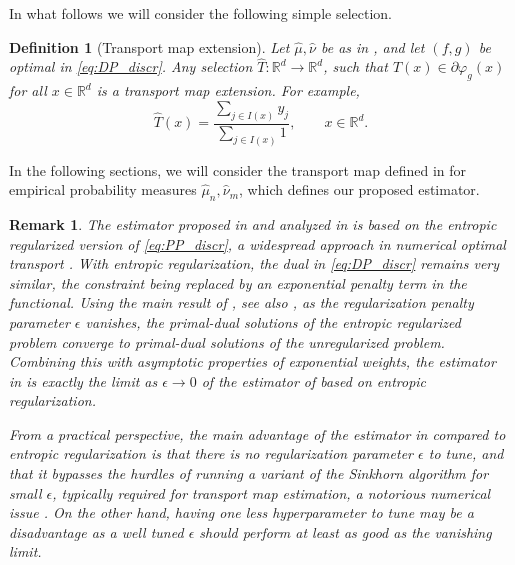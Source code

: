 \documentclass[11pt]{article}
\newtheorem{definition}[lemma]{Definition}
\newtheorem{remark}[lemma]{Remark}
\newcommand{\R}{\mathbb R}
\newcommand{\1}{\mathbbm{1}}
\numberwithin{equation}{section}
\begin{document}
In what follows we will consider the following simple selection.
\begin{definition}[Transport map extension]
    Let $\hat\mu,\hat\nu$ be as in , and let $(f,g)$ be optimal in \eqref{eq:DP_discr}.
    Any  selection $\hat T \colon \R^d \to \R^d$, such that $\hat T(x) \in \partial \varphi_g(x)$ for all $x \in \R^d$ is a transport map extension. For example, 
    \begin{equation*}
        \hat T(x) = \frac{\sum_{j \in I(x)} y_j}{\sum_{j \in I(x)} 1}, \qquad x \in \R^d.
    \end{equation*}
\label{def:transportmap_estimator}
\end{definition}


In the following sections, we will consider the transport map defined in  for empirical probability measures $\hat\mu_n,\hat\nu_m$, which defines our proposed estimator.

\begin{remark}
    The estimator proposed in \cite{seguy2018large} and analyzed in \cite{pooladian2021entropic,pooladian2023minimax} is based on the entropic regularized version of \eqref{eq:PP_discr}, a widespread approach in numerical optimal transport 
    \cite{cuturi2013sinkhorn,peyre2019computational}. With entropic regularization, the dual in \eqref{eq:DP_discr} remains very similar, the constraint being replaced by an exponential penalty term in the functional. Using the main result of \cite{cominetti1994asymptotic}, see also \cite{genevay2016stochastic,weed2018explicit}, as the regularization penalty parameter $\epsilon$ vanishes, the primal-dual solutions of the entropic regularized problem converge to primal-dual solutions of the unregularized problem. Combining this with asymptotic properties of exponential weights, the estimator in  is exactly the limit as $\epsilon \to 0$ of the estimator of \cite{seguy2018large, pooladian2021entropic,pooladian2023minimax} based on entropic regularization.

    From a practical perspective, the main advantage of the estimator in  compared to entropic regularization is that there is no regularization parameter $\epsilon$ to tune, and that it bypasses the hurdles of running a variant of the Sinkhorn algorithm for small $\epsilon$, typically required for transport map estimation, a notorious numerical issue \cite{peyre2019computational,chhaibi2025faster}. On the other hand, having one less hyperparameter to tune may be a disadvantage as a well tuned $\epsilon$ should perform at least as good as the vanishing limit.
    \label{rem:entropicRegularizationLimit}
\end{remark}
\end{document}
